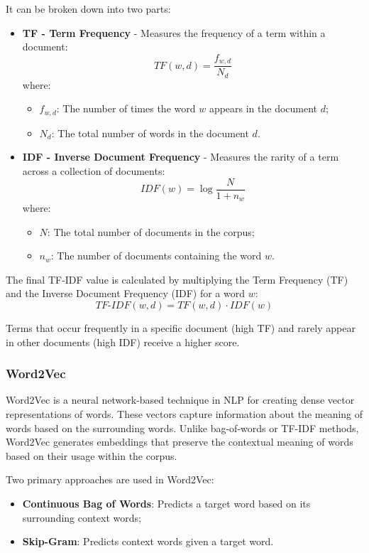 It can be broken down into two parts:


\begin{itemize}
  \item \textbf{TF - Term Frequency} - Measures the frequency of a term within
    a document:
  \[
  TF(w, d) = \frac{f_{w, d}}{N_d}
  \]
  where:
  \begin{itemize}
    \item \( f_{w, d} \): The number of times the word \( w \) appears in the
      document \( d \);
    \item \( N_d \): The total number of words in the document \( d \).
  \end{itemize}

  \item \textbf{IDF - Inverse Document Frequency} - Measures the rarity of a
    term across a collection of documents:
  \[
  IDF(w) = \log{\frac{N}{1 + n_w}}
  \]
  where:
  \begin{itemize}
    \item \( N \): The total number of documents in the corpus;
    \item \( n_w \): The number of documents containing the word \( w \).
  \end{itemize}
\end{itemize}


The final TF-IDF value is calculated by multiplying the Term Frequency (TF) and
the Inverse Document Frequency (IDF) for a word \( w \):  
\[  
TF\text{-}IDF(w, d) = TF(w, d) \cdot IDF(w)  
\]  

Terms that occur frequently in a specific document (high TF) and rarely appear
in other documents (high IDF) receive a higher score.

\subsubsection*{Word2Vec}

Word2Vec is a neural network-based technique in NLP for creating dense vector
representations of words. These vectors capture information about the meaning
of words based on the surrounding words. Unlike bag-of-words or TF-IDF methods,
Word2Vec generates embeddings that preserve the contextual meaning of words
based on their usage within the corpus.\cite{w2v}

Two primary approaches are used in Word2Vec: 
\begin{itemize} 
  \item \textbf{Continuous Bag of Words}: Predicts a target word based
    on its surrounding context words;
  \item \textbf{Skip-Gram}: Predicts context words given a target word.
\end{itemize}

